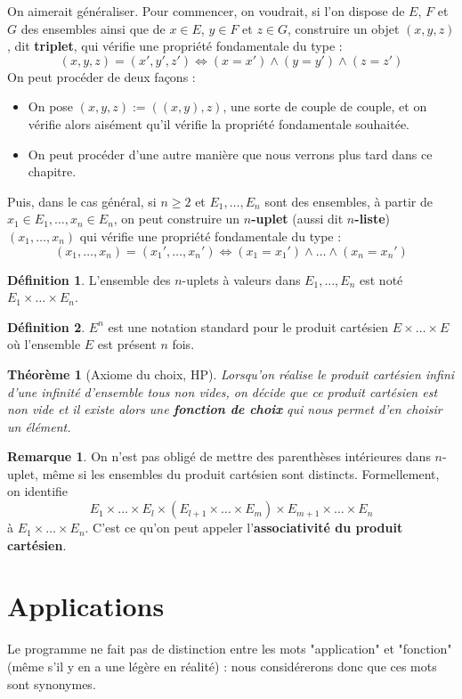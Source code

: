 \documentclass[french]{book}
\theoremstyle{plain}
\newtheorem{thm}{Théorème}[chapter]
\theoremstyle{definition}
\newtheorem{dfn}{Définition}[chapter]
\newtheorem{rmq}{Remarque}[chapter]
\theoremstyle{remark}
\begin{document}
On aimerait généraliser. Pour commencer, on voudrait, si l'on dispose de $E$, $F$ et $G$ des ensembles ainsi que de $x\in E$, $y\in F$ et $z\in G$, construire un objet $(x,y,z)$, dit \textbf{triplet}, qui vérifie une propriété fondamentale du type : $$(x,y,z)=(x',y',z')\iff(x=x')\land(y=y')\land(z=z')$$ On peut procéder de deux façons : 
\begin{itemize}
	\item On pose $(x,y,z):=((x,y),z)$, une sorte de couple de couple, et on vérifie alors aisément qu'il vérifie la propriété fondamentale souhaitée.
	\item On peut procéder d'une autre manière que nous verrons plus tard dans ce chapitre.
\end{itemize}
Puis, dans le cas général, si $n\geqslant 2$ et $E_1,\ldots,E_n$ sont des ensembles, à partir de $x_1\in E_1,\ldots,x_n\in E_n$, on peut construire un \textbf{$n$-uplet} (aussi dit \textbf{$n$-liste}) $(x_1,\ldots,x_n)$ qui vérifie une propriété fondamentale du type : $$(x_1,\ldots,x_n)=(x_1',\ldots,x_n')\iff(x_1=x_1')\land\ldots\land(x_n=x_n')$$
\begin{dfn}
	L'ensemble des $n$-uplets à valeurs dans $E_1,\ldots,E_n$ est noté $E_1\times\ldots\times E_n$.
\end{dfn}
\begin{dfn}
	$E^n$ est une notation standard pour le produit cartésien $E\times\ldots\times E$ où l'ensemble $E$ est présent $n$ fois.
\end{dfn}
\begin{thm}[Axiome du choix, HP]
	Lorsqu'on réalise le produit cartésien infini d'une infinité d'ensemble tous non vides, on décide que ce produit cartésien est non vide et il existe alors une \textbf{fonction de choix} qui nous permet d'en choisir un élément.
\end{thm}
\begin{rmq}
	On n'est pas obligé de mettre des parenthèses intérieures dans $n$-uplet, même si les ensembles du produit cartésien sont distincts. Formellement, on identifie $$E_1\times\ldots\times E_l\times(E_{l+1}\times\ldots\times E_m)\times E_{m+1}\times\ldots\times E_n$$ à $E_1\times\ldots\times E_n$. C'est ce qu'on peut appeler l'\textbf{associativité du produit cartésien}.
\end{rmq}

\section{Applications}
Le programme ne fait pas de distinction entre les mots "application" et "fonction" (même s'il y en a une légère en réalité) : nous considérerons donc que ces mots sont synonymes.
\end{document}

